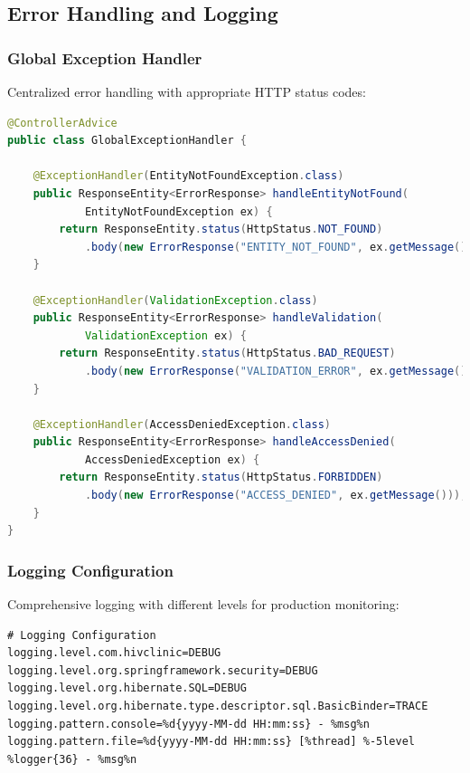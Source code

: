 \documentclass[12pt,a4paper]{article}
\begin{document}
\subsection{Error Handling and Logging}

\subsubsection{Global Exception Handler}
Centralized error handling with appropriate HTTP status codes:

\begin{lstlisting}[language=Java]
@ControllerAdvice
public class GlobalExceptionHandler {
    
    @ExceptionHandler(EntityNotFoundException.class)
    public ResponseEntity<ErrorResponse> handleEntityNotFound(
            EntityNotFoundException ex) {
        return ResponseEntity.status(HttpStatus.NOT_FOUND)
            .body(new ErrorResponse("ENTITY_NOT_FOUND", ex.getMessage()));
    }
    
    @ExceptionHandler(ValidationException.class)
    public ResponseEntity<ErrorResponse> handleValidation(
            ValidationException ex) {
        return ResponseEntity.status(HttpStatus.BAD_REQUEST)
            .body(new ErrorResponse("VALIDATION_ERROR", ex.getMessage()));
    }
    
    @ExceptionHandler(AccessDeniedException.class)
    public ResponseEntity<ErrorResponse> handleAccessDenied(
            AccessDeniedException ex) {
        return ResponseEntity.status(HttpStatus.FORBIDDEN)
            .body(new ErrorResponse("ACCESS_DENIED", ex.getMessage()));
    }
}
\end{lstlisting}

\subsubsection{Logging Configuration}
Comprehensive logging with different levels for production monitoring:

\begin{lstlisting}[language=Properties]
# Logging Configuration
logging.level.com.hivclinic=DEBUG
logging.level.org.springframework.security=DEBUG
logging.level.org.hibernate.SQL=DEBUG
logging.level.org.hibernate.type.descriptor.sql.BasicBinder=TRACE
logging.pattern.console=%d{yyyy-MM-dd HH:mm:ss} - %msg%n
logging.pattern.file=%d{yyyy-MM-dd HH:mm:ss} [%thread] %-5level %logger{36} - %msg%n
\end{lstlisting}
\end{document}
